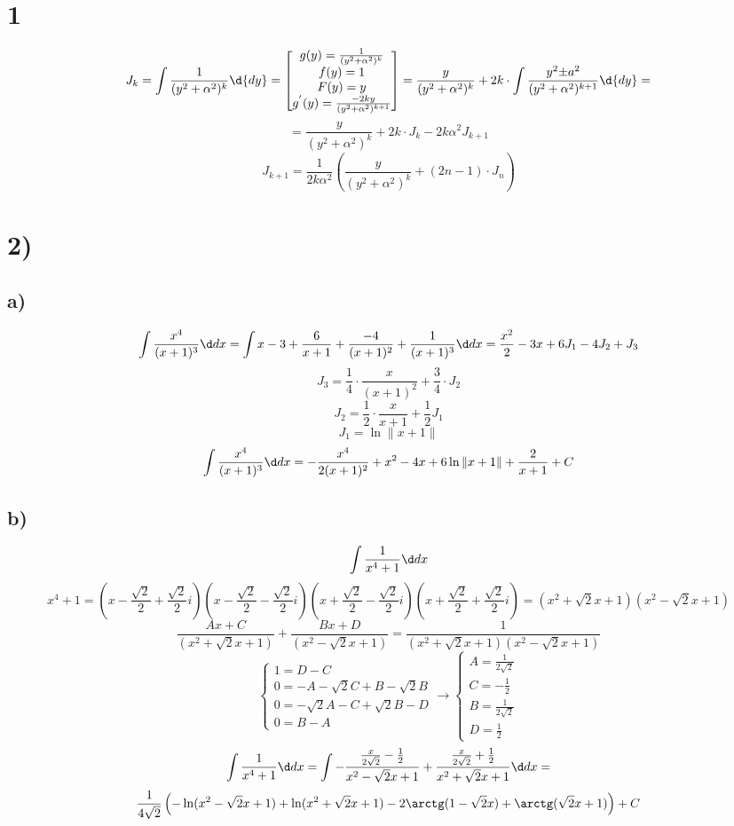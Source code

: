 
\renewcommand{\t}{\frac{\sqrt2}{2}}

	\section*{1}
	$$J_k = \int\frac{1}{(y^2+\alpha^2)^k}\d{dy} = \begin{bmatrix}g(y)  =\frac{1}{(y^2+\alpha^2)^k}\\
		f(y) = 1 \\
		F(y) = y \\
		g^{'}(y)  = \frac{-2ky}{(y^2+\alpha^2)^{k+1}}\end{bmatrix} = \frac{y}{(y^2+\alpha^2)^k} +2k\cdot\int\frac{y^2\text{\textpm} a^2}{(y^2+\alpha^2)^{k+1}}\d{dy} = $$
		$$  =\frac{y}{(y^2+\alpha^2)^k} + 2k\cdot J_k - 2k\alpha^2J_{k+1}	$$ 
		$$J_{k+1} = \frac{1}{2k\alpha^2}\left(\frac{y}{(y^2+\alpha^2)^k} + (2n-1)\cdot J_n\right)$$
		\section*{2)}
		\subsection*{a)} 
		$$\int \frac{x^4}{(x+1)^3}\dx = \int x-3 + \frac{6}{x+1} +\frac{-4}{(x+1)^2} + \frac{1}{(x+1)^3}\dx = \frac{x^2}{2} -3x + 6J_1 - 4J_2 + J_3  $$
		$$J_3 = \frac14\cdot \frac{x}{(x+1)^2} + \frac34\cdot J_2$$
		$$J_2 = \frac12\cdot\frac{x}{x+1} + \frac12J_1$$
	$$J_1 = \ln\|x+1\|$$		
	$$\int \frac{x^4}{(x+1)^3}\dx = -\frac{x^4}{2(x+1)^2} + x^2-4x + 6\ln\|x+1\| + \frac{2}{x+1} + C$$
	\subsection*{b)}
	$$\int\frac{1}{x^4+1}\dx$$ 
	$$x^4+1 = (x-\t+\t i)(x-\t -\t i)(x+\t-\t i)(x+\t+\t i) = (x^2+\sqrt2 x +1)(x^2-\sqrt2 x + 1)$$
	$$\frac{Ax+C}{(x^2+\sqrt2 x +1) } + \frac{Bx+D}{(x^2-\sqrt2 x +1) }  = \frac{1}{(x^2+\sqrt2 x +1)(x^2-\sqrt2 x + 1)}$$
	$$\begin{cases}1 = D-C\\
	0  =-A -\sqrt2 C + B -\sqrt2 B\\
	0 = -\sqrt2A-C+\sqrt{2}B - D\\
	0 = B-A\end{cases}\to \begin{cases}A = \frac{1}{2\sqrt2}\\
	C = -\frac12\\
	B = \frac{1}{2\sqrt2}\\
	D = \frac12\end{cases}$$ 
	$$\int\frac{1}{x^4+1}\dx = \int -\frac{\frac{x}{2\sqrt2}-\frac12}{x^2-\sqrt2x+1} +\frac{\frac{x}{2\sqrt2}+\frac12}{x^2+\sqrt2x+1}\dx =$$ $$\frac{1}{4\sqrt2}\left(-\ln(x^2-\sqrt2x+1) + \ln(x^2+\sqrt2x+1)-2\arctg(1-\sqrt2x) + \arctg(\sqrt2x+1)\right) + C$$
